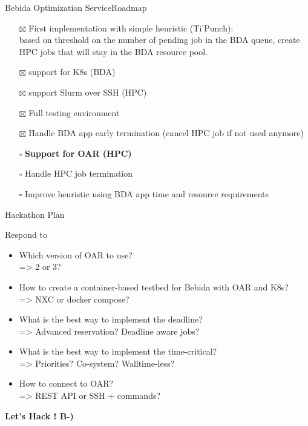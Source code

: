 \documentclass[10pt, compress, titleprogressbar, aspectratio=169]{beamer}
\begin{document}
        \begin{frame}{Bebida Optimization Service}{Roadmap}
            \begin{itemize}
                \item[$\boxtimes$]
                    First implementation with simple heuristic (Ti'Punch):\\
                    based on threshold on the number of pending job in the BDA queue, create HPC
                    jobs that will stay in the BDA resource pool.
                \item[$\boxtimes$]
                    support for K8s (BDA)
                \item[$\boxtimes$]
                    support Slurm over SSH (HPC)
                \item[$\boxtimes$]
                    Full testing environment
                \item[$\boxtimes$]
                    Handle BDA app early termination (cancel HPC job if not used anymore)
                \item[$\square$]
                    \textbf{Support for OAR (HPC)}
                \item[$\square$]
                    Handle HPC job termination
                \item[$\square$]
                    Improve heuristic using BDA app time and resource requirements
            \end{itemize}
        \end{frame}

        \begin{frame}{Hackathon Plan}
            \begin{block}{Respond to}
                \begin{itemize}
                    \item
                        Which version of OAR to use?\\
                        =\textgreater{} 2 or 3?
                    \item
                        How to create a container-based testbed for Bebida with OAR and K8s?\\
                        =\textgreater{} NXC or docker compose?
                    \item
                        What is the best way to implement the deadline?\\
                        =\textgreater{} Advanced reservation? Deadline aware jobs?
                    \item
                        What is the best way to implement the time-critical?\\
                        =\textgreater{} Priorities? Co-system? Walltime-less?
                    \item
                        How to connect to OAR?\\
                        =\textgreater{} REST API or SSH + commands?
                \end{itemize}
                \hfill \break
                \centering{}
                \textbf{Let's Hack ! B-)}
            \end{block}
        \end{frame}
    
\end{document}
